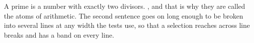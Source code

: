 A prime is a number with exactly two divisors. , and that is why they
are called the atoms of arithmetic. The second sentence goes on long
enough to be broken into several lines at any width the tests use, so that
a selection reaches across line breaks and has a band on every line.
